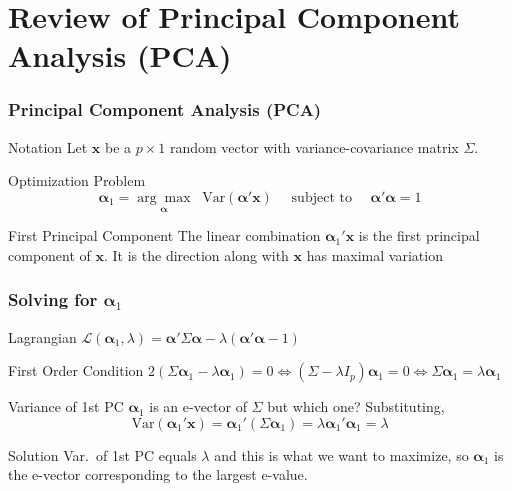 \section{Review of Principal Component Analysis (PCA)}
\begin{frame}
  \frametitle{Principal Component Analysis (PCA)}
  
  \begin{block}{Notation}
  Let $\mathbf{x}$ be a $p\times 1$ random vector with variance-covariance matrix $\Sigma$.
  \end{block}

  \begin{block}{Optimization Problem}
    \vspace{-1em}
    \[\boldsymbol{\alpha}_1 = \underset{\boldsymbol{\alpha}}{\arg \max} \; \;\mbox{Var}(\boldsymbol{\alpha}' \mathbf{x}) \quad \text{ subject to } \quad \boldsymbol{\alpha}'\boldsymbol{\alpha} = 1\]
  \end{block}

  \begin{block}{First Principal Component}
    The linear combination $\boldsymbol{\alpha}_1' \mathbf{x}$ is the \alert{first principal component} of $\mathbf{x}$.
    It is the direction along with $\mathbf{x}$ has \alert{maximal variation}
  \end{block}
\end{frame}
\begin{frame}
  \frametitle{Solving for $\boldsymbol{\alpha}_1$}

  \begin{block}{Lagrangian}
  $\mathcal{L}(\boldsymbol{\alpha}_1, \lambda) = \boldsymbol{\alpha}' \Sigma \boldsymbol{\alpha} - \lambda(\boldsymbol{\alpha}' \boldsymbol{\alpha} - 1)$
  \end{block}

  \begin{block}{First Order Condition}
    $2 (\Sigma\boldsymbol{\alpha}_1 - \lambda \boldsymbol{\alpha}_1) = 0 \iff (\Sigma - \lambda I_p)\boldsymbol{\alpha}_1 = 0 \iff \Sigma \boldsymbol{\alpha}_1 = \lambda \boldsymbol{\alpha}_1$
  \end{block}

  \begin{block}{Variance of 1st PC}
    $\boldsymbol{\alpha}_1$ is an e-vector of $\Sigma$ but which one? 
    Substituting, 
    \[
      \mbox{Var}(\boldsymbol{\alpha}_1' \mathbf{x}) = \boldsymbol{\alpha}_1'(\Sigma \boldsymbol{\alpha}_1) = \lambda \boldsymbol{\alpha}_1' \boldsymbol{\alpha}_1 = \lambda
    \]
  \end{block}
  \vspace{-1em}

  \begin{alertblock}{Solution}
    Var.\ of 1st PC equals $\lambda$ and this is what we want to \alert{maximize}, so $\boldsymbol{\alpha}_1$ is the e-vector corresponding to the largest e-value.
  \end{alertblock}


\end{frame}
